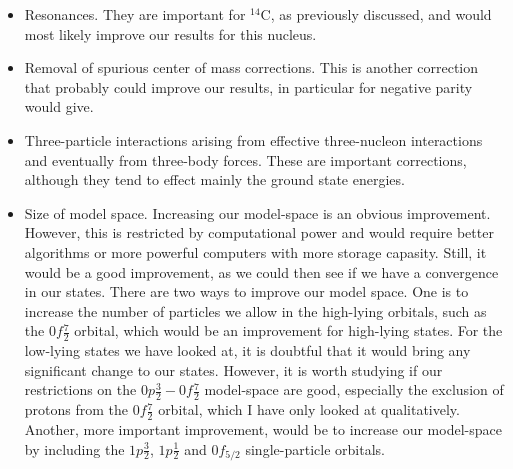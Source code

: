\begin{itemize}

\item Resonances. They are important for $^{14}$C, as previously discussed, and
would most likely improve our results for this nucleus.

\item Removal of spurious center of mass corrections. This is another correction that probably
could improve our results, in particular for negative parity
would give.

\item Three-particle interactions arising from effective three-nucleon interactions and eventually from
three-body forces. These are important corrections, although  they tend to  effect mainly the ground state energies.   

\item Size of model space. Increasing our model-space is an obvious improvement.
However, this is restricted by computational power and would require better
algorithms or more powerful computers with more storage capasity. Still, it
would be a good improvement, as we could then see if we have a convergence in
our states. There are two ways to improve our model space. One is to increase
the number of particles we allow in the high-lying orbitals, such as the
$0f\frac72$ orbital, which would be an improvement for high-lying states. For the
low-lying states we have looked at, it is doubtful that it would bring any
significant change to our states. However, it is worth studying 
if our restrictions on the $0p\frac32-0f\frac72$ model-space are
good, especially the exclusion of protons from the $0f\frac72$ orbital, which I have only looked at qualitatively. Another,
more important improvement, would be to increase our model-space by including
the $1p\frac32$, $1p\frac12$ and $0f_{5/2}$ single-particle orbitals.

\end{itemize}
